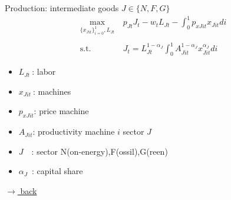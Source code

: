 \documentclass[11pt,aspectratio=169]{beamer}
\begin{document}
	\begin{frame}{Production: intermediate goods $J\in \{N,F,G\}$ }
		\vspace{0mm}
		\begin{align*}
			\underset{\{x_{Jit}\}_{i=0}^1, L_{Jt}}{\max}\ & p_{Jt}J_t-w_{t}L_{Jt}-\int_{0}^{1}p_{xJit}x_{Jit}di \\ \ \\
			\text{s.t.}\ & J_{t}=L_{Jt}^{1-\alpha_J}\int_{0}^{1}A^{1-\alpha_J}_{Jit}x_{Jit}^{\alpha_J}di
		\end{align*}
		
		\small
		\vspace{10mm}
		\hspace{-4mm}
		\begin{minipage}[t!]{0.3\textwidth}
			\vspace{0mm}
			\begin{itemize}	
				\item[]$L_{Jt}\ $: labor 
				\vspace{-2mm}	
				\item[]$x_{Jit}\ $: machines 
				\vspace{-2mm}	
				\item[]$p_{xJit}$: price machine 
			\end{itemize}
		\end{minipage}
		\begin{minipage}[t!]{0.5\textwidth}
			\vspace{0mm}
			\begin{itemize}
				\item[] $A_{Jit}$: productivity machine $i$ sector $J$ \vspace{-2mm}
				\item[] $J$\ \  : sector N(on-energy),F(ossil),G(reen)
				\vspace{-2mm}	
				\item[] $\alpha_J$\ : capital share 
			\end{itemize}
		\end{minipage}
	
	\hfill \hyperlink{backScheme}{\tiny{$\rightarrow$ back}}
	\end{frame}
	
\end{document}
